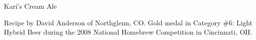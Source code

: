 \documentclass[parskip=half,fontsize=9pt,oneside]{scrbook}
\begin{document}
\mainmatter


\begin{recipe}{Kari's Cream Ale}

\begin{aboutblock}
Recipe by David Anderson of Northglenn, CO. Gold medal in Category \#6: Light
Hybrid Beer during the 2008 National Homebrew Competition in Cincinnati, OH.
\sourceaha
\end{aboutblock}


\begin{methodandtiming}

\begin{mashsteps}
\end{mashsteps}

\begin{fermentationsteps}
\end{fermentationsteps}

\end{methodandtiming}

\recipebreak

\begin{ingredientsblock}

\begin{malts}
\end{malts}

\begin{hops}
\end{hops}


\end{ingredientsblock}

\end{recipe}


\end{document}
